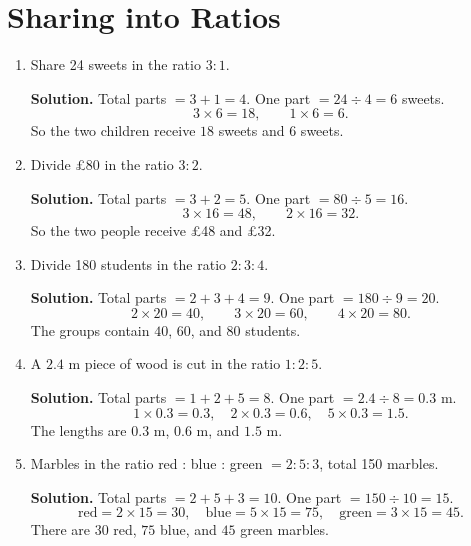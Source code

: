 \documentclass[12pt,a4paper]{article}
\begin{document}
\section*{Sharing into Ratios}
\begin{enumerate}
\item Share 24 sweets in the ratio \(3:1\).

\textbf{Solution.} Total parts \(=3+1=4\). One part \(=24\div4=6\) sweets.
\[
3\times6=18,\qquad 1\times6=6.
\]
So the two children receive \(18\) sweets and \(6\) sweets.

\item Divide \pounds80 in the ratio \(3:2\).

\textbf{Solution.} Total parts \(=3+2=5\). One part \(=80\div5=16\).
\[
3\times16=48,\qquad 2\times16=32.
\]
So the two people receive \pounds48 and \pounds32.

\item Divide 180 students in the ratio \(2:3:4\).

\textbf{Solution.} Total parts \(=2+3+4=9\). One part \(=180\div9=20\).
\[
2\times20=40,\qquad 3\times20=60,\qquad 4\times20=80.
\]
The groups contain \(40\), \(60\), and \(80\) students.

\item A \(2.4\) m piece of wood is cut in the ratio \(1:2:5\).

\textbf{Solution.} Total parts \(=1+2+5=8\). One part \(=2.4\div8=0.3\) m.
\[
1\times0.3=0.3,\quad 2\times0.3=0.6,\quad 5\times0.3=1.5.
\]
The lengths are \(0.3\) m, \(0.6\) m, and \(1.5\) m.

\item Marbles in the ratio red : blue : green \(=2:5:3\), total 150 marbles.

\textbf{Solution.} Total parts \(=2+5+3=10\). One part \(=150\div10=15\).
\[
\text{red}=2\times15=30,\quad
\text{blue}=5\times15=75,\quad
\text{green}=3\times15=45.
\]
There are \(30\) red, \(75\) blue, and \(45\) green marbles.
\end{enumerate}
\end{document}
